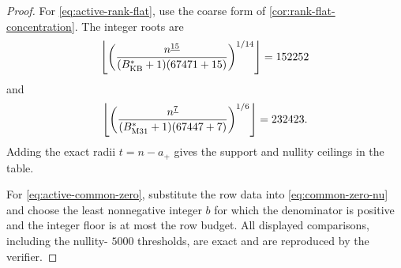 \documentclass[11pt,a4paper]{amsart}
\numberwithin{equation}{section}
\theoremstyle{remark}
\begin{document}
\begin{proof}
For \eqref{eq:active-rank-flat}, use the coarse form of
\cref{cor:rank-flat-concentration}.  The integer roots are
\[
 \left\lfloor
 \left(
 \frac{n^{\underline{15}}}{(B^*_{\rm KB}+1)(67471+15)}
 \right)^{1/14}
 \right\rfloor=152252
\]
and
\[
 \left\lfloor
 \left(
 \frac{n^{\underline 7}}{(B^*_{\rm M31}+1)(67447+7)}
 \right)^{1/6}
 \right\rfloor=232423.
\]
Adding the exact radii \(t=n-a_+\) gives the support and nullity ceilings
in the table.

For \eqref{eq:active-common-zero}, substitute the row data into
\eqref{eq:common-zero-nu} and choose the least nonnegative integer \(b\)
for which the denominator is positive and the integer floor is at most the
row budget.  All displayed comparisons, including the nullity-
\(5000\) thresholds, are exact and are reproduced by the verifier.
\end{proof}
\end{document}
